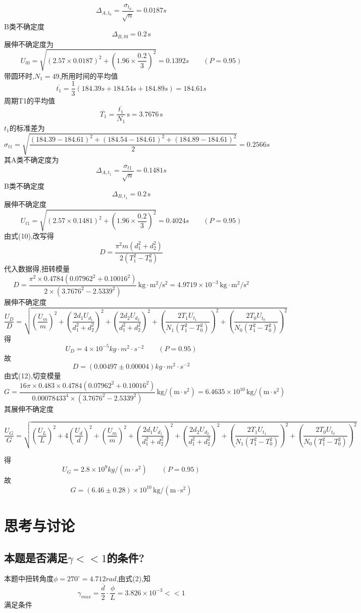 \documentclass[12pt,a4paper,oneside]{ctexart}
\begin{document}
$$\Delta_{A,t_0}=\dfrac{\sigma_{t_0}}{\sqrt{n}}=0.0187s$$
B类不确定度
$$
\Delta_{B,t0}=0.2\,\mathrm{s}
$$
展伸不确定度为
$$
U_{t0}=\sqrt{(2.57\times0.0187)^2+(1.96\times\frac{0.2}{3})^2}=0.1392s \qquad(P=0.95)
$$
带圆环时,$N_1=49$,所用时间的平均值
$$\overline{t_1}=\dfrac{1}{3}(184.39s+184.54s+184.89s)=184.61s$$
周期T1的平均值
$$
\overline{T_1}=\frac{\overline{t_1}}{N_1}\,\mathrm{s}=3.7676\,\mathrm{s}
$$
$t_1$的标准差为
$$\sigma_{t1}=\sqrt{\dfrac{(184.39-184.61)^2+(184.54-184.61)^2+(184.89-184.61)^2}{2}}=0.2566s$$
其A类不确定度为
$$\Delta_{A,t_1}=\dfrac{\sigma_{t1}}{\sqrt{n}}=0.1481s$$
B类不确定度
$$
\Delta_{B,t_1}=0.2\,\mathrm{s}
$$
展伸不确定度
$$
U_{t1}=\sqrt{(2.57\times0.1481)^2+(1.96\times\frac{0.2}{3})^2}=0.4024s \qquad(P=0.95)
$$
由式(10),改写得
\begin{equation}
    D=\dfrac{\pi^2m(d_1^2+d_2^2)}{2(T_1^2-T_0^2)}
\end{equation}
代入数据得,扭转模量
$$
D=\frac{\pi^2\times 0.4784 \left(0.07962^2+0.10016^2\right)}{2\times(3.7676^2-2.5339^2)}\,\mathrm{kg·m^2/s^2}=4.9719 \times 10^{-3}\,\mathrm{kg·m^2/s^2}
$$
展伸不确定度
$$
\dfrac{U_D}{D}=\sqrt{(\frac{U_m}{m})^2+(\frac{2d_1U_{d_1}}{d_1^2+d_2^2})^2+(\frac{2d_2U_{d_2}}{d_1^2+d_2^2})^2+(\frac{2T_1U_{t_1}}{N_1(T_1^2-T_0^2)})^2+(\frac{2T_0U_{t_0}}{N_0(T_1^2-T_0^2)})^2}
$$
得$$U_D=4\times10^{-5}kg\cdot m^2\cdot s^{-2} \qquad(P=0.95)$$
故
$$
D=\left(0.00497 \pm 0.00004\right)kg\cdot m^2\cdot s^{-2}
$$
\noindent
由式(12),切变模量
$$
G=\frac{16 \pi\times 0.483\times 0.4784 \left(0.07962^2+0.10016^2\right)}{0.00078433^4\times \left(3.7676^2-2.5339^2\right)}\,\mathrm{kg/(m·s^2)}=6.4635 \times 10^{10}\,\mathrm{kg/(m·s^2)}
$$
其展伸不确定度
\begin{footnotesize}
$$
\dfrac{U_G}{G}=\sqrt{(\frac{U_L}{L})^2+4(\frac{U_d}{d})^2+(\frac{U_m}{m})^2+(\frac{2d_1U_{d_1}}{d_1^2+d_2^2})^2+(\frac{2d_2U_{d_2}}{d_1^2+d_2^2})^2+(\frac{2T_1U_{t_1}}{N_1(T_1^2-T_0^2)})^2+(\frac{2T_0U_{t_0}}{N_0(T_1^2-T_0^2)})^2}
$$
\end{footnotesize}
得
$$U_G=2.8\times10^9kg/(m·s^2) \qquad(P=0.95)$$
故
$$
G=\left(6.46 \pm 0.28\right) \times 10^{10}\,\mathrm{kg/(m·s^2)}
$$
\section{思考与讨论}
\subsection{本题是否满足$\gamma<<1$的条件?}
    本题中扭转角度$\phi=270^{\circ}=4.712rad$,由式(2),知$$\gamma_{max}=\dfrac{\overline{d}}{2}\cdot\dfrac{\phi}{L}=3.826\times10^{-3}<<1$$
满足条件
\end{document}
